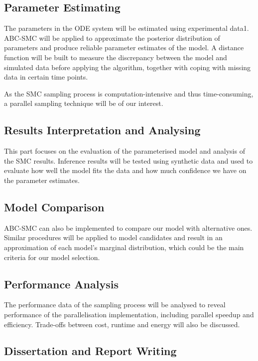\documentclass{article}
\begin{document}
\subsection{Parameter Estimating}

The parameters in the ODE system will be estimated using experimental data1. ABC-SMC will be applied to approximate the posterior distribution of parameters and produce reliable parameter estimates of the model. A distance function will be built to measure the discrepancy between the model and simulated data before applying the algorithm, together with coping with missing data in certain time points.

As the SMC sampling process is computation-intensive and thus time-consuming, a parallel sampling technique will be of our interest. 

\subsection{Results Interpretation and Analysing}

This part focuses on the evaluation of the parameterised model and analysis of the SMC results. Inference results will be tested using synthetic data and used to evaluate how well the model fits the data and how much confidence we have on the parameter estimates.

\subsection{Model Comparison}

ABC-SMC can also be implemented to compare our model with alternative ones. Similar procedures will be applied to model candidates and result in an approximation of each model’s marginal distribution, which could be the main criteria for our model selection.

\subsection{Performance Analysis}

The performance data of the sampling process will be analysed to reveal performance of the parallelisation implementation, including parallel speedup and efficiency. Trade-offs between cost, runtime and energy will also be discussed.

\subsection{Dissertation and Report Writing}
\end{document}

